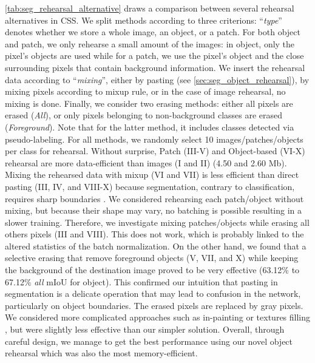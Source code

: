 \autoref{tab:seg_rehearsal_alternative} draws a comparison between several rehearsal alternatives in
\ac{CSS}. We split methods according to three criterions: ``\textit{type}'' denotes whether we store
a whole image, an object, or a patch. For both object and patch, we only rehearse a small amount of
the images: in object, only the pixel's objects are used while for a patch, we use the pixel's
object and the close surrounding pixels that contain background information. We insert the rehearsal
data according to ``\textit{mixing}'', either by pasting (see \autoref{sec:seg_object_rehearsal}),
by mixing pixels according to mixup \citep{hingyi2018mixup} rule, or in the case of image rehearsal,
no mixing is done. Finally, we consider two erasing methods: either all pixels are erased
(\textit{All}), or only pixels belonging to non-background classes are erased (\textit{Foreground}).
Note that for the latter method, it includes classes detected via pseudo-labeling. For all methods,
we randomly select 10 images/patches/objects per class for rehearsal. Without surprise, Patch
(III-V) and Object-based (VI-X) rehearsal are more data-efficient than images (I and II) (4.50 and
2.60  Mb). Mixing the rehearsed data with mixup (VI and VII) is less efficient than direct
pasting (III, IV, and VIII-X) because segmentation, contrary to classification, requires sharp
boundaries \citep{chen2020semeda}. We considered rehearsing each patch/object without mixing, but
because their shape may vary, no batching is possible resulting in a slower training. Therefore, we
investigate mixing patches/objects while erasing all others pixels (III and VIII). This does not
work, which is probably linked to the altered statistics of the batch normalization. On the other
hand, we found that a selective erasing that remove foreground objects (V, VII, and X) while keeping
the background of the destination image proved to be very effective (63.12\% to 67.12\% \textit{all}
\ac{mIoU} for object). This confirmed our intuition that pasting in segmentation is a delicate
operation that may lead to confusion in the network, particularly on object boundaries. The erased
pixels are replaced by gray pixels. We considered more complicated approaches such as in-painting
\citep{fang2019instaboost} or textures filling \citep{mallikarjuna2006kth-tips}, but were slightly
less effective than our simpler solution. Overall, through careful design, we manage to get the best
performance using our novel object rehearsal which was also the most memory-efficient.

